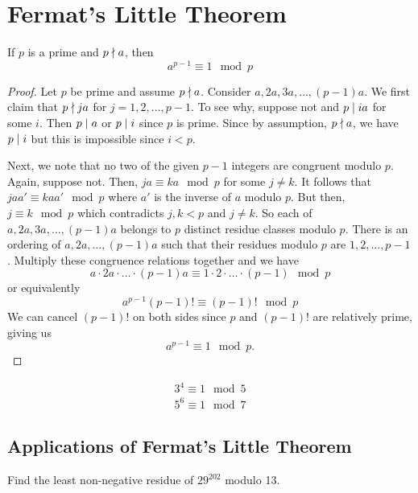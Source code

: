 \section{Fermat's Little Theorem}

\begin{theorem}
    If $p$ is a prime and $p \mathrel{\nmid} a$, then
    $$
    a^{p-1} \equiv 1 \mod p
    $$
\end{theorem}

\begin{proof}
    Let $p$ be prime and assume $p \mathrel{\nmid} a$. Consider $a, 2a, 3a, \ldots, (p-1)a$. We first claim that $p \mathrel{\nmid} ja$ for $j = 1,2,\ldots,p-1$. To see why, suppose not and $p \mathrel{\mid} ia$ for some $i$. Then $p \mathrel{\mid} a$ or $p \mathrel{\mid} i$ since $p$ is prime. Since by assumption, $p \mathrel{\nmid} a$, we have $p \mathrel{\mid} i$ but this is impossible since $i < p$.

    Next, we note that no two of the given $p-1$ integers are congruent modulo $p$. Again, suppose not. Then, $ja \equiv ka \mod p$ for some $j \neq k$. It follows that $jaa' \equiv kaa' \mod p$ where $a'$ is the inverse of $a$ modulo $p$. But then, $j \equiv k \mod p$ which contradicts $j,k < p$ and $j \neq k$. So each of $a,2a,3a,\ldots,(p-1)a$ belongs to $p$ distinct residue classes modulo $p$. There is an ordering of $a,2a,\ldots,(p-1)a$ such that their residues modulo $p$ are $1,2,\ldots,p-1$. Multiply these congruence relations together and we have
    $$
    a \cdot 2a \cdot \ldots \cdot (p-1)a \equiv 1 \cdot 2 \cdot \ldots \cdot (p-1) \mod p
    $$
    or equivalently
    $$
    a^{p-1} (p-1)! \equiv (p-1)! \mod p
    $$
    We can cancel $(p-1)!$ on both sides since $p$ and $(p-1)!$ are relatively prime, giving us
    $$
    a^{p-1} \equiv 1 \mod p.
    $$
\end{proof}

\begin{example}
    $$
    \begin{aligned}
        3^4 \equiv 1 \mod 5 \\
        5^6 \equiv 1 \mod 7
    \end{aligned}
    $$
\end{example}

\subsection{Applications of Fermat's Little Theorem}

\begin{example}
    Find the least non-negative residue of $29^{202}$ modulo 13.
\end{example}

